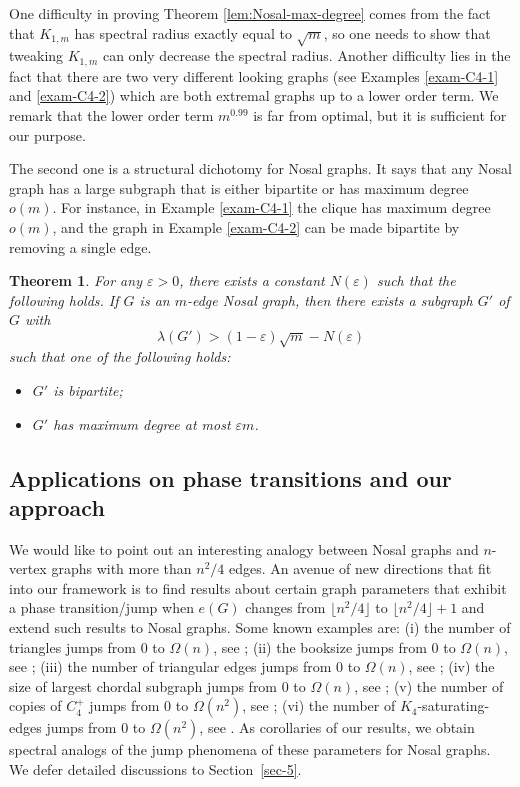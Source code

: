 \documentclass[11pt,a4paper]{article}
\newtheorem{theorem}{Theorem}[section]
\theoremstyle{definition}
\theoremstyle{remark}
\begin{document}
One difficulty in proving Theorem \ref{lem:Nosal-max-degree} comes from the fact that  $K_{1, m}$ has spectral radius exactly equal to $\sqrt{m}$, so one needs to show that tweaking $K_{1, m}$ can only decrease the spectral radius. Another difficulty lies in the fact that there are two very different looking graphs (see Examples \ref{exam-C4-1} and \ref{exam-C4-2}) which are both extremal graphs up to a lower order term. We remark that the lower order term $m^{0.99}$ is far from optimal, but it is sufficient for our purpose.

The second one is a structural dichotomy for Nosal graphs. It says that any Nosal graph has a large subgraph that is either bipartite or has maximum degree $o(m)$. For instance, in Example \ref{exam-C4-1} the clique has maximum degree $o(m)$, and the graph in Example \ref{exam-C4-2} can be made bipartite by removing a single edge. 

\begin{theorem}
    \label{lem:Nosal-structure}
    For any $\varepsilon > 0$, there exists a constant $N(\varepsilon)$ such that the following holds. If $G$ is an $m$-edge Nosal graph, then there exists a subgraph $G'$ of $G$ with 
    \[ \lambda(G') > (1 - \varepsilon) \sqrt{m} - N(\varepsilon) \]
    such that one of the following holds: 
    \begin{itemize}
        \item[\rm (a)] $G'$ is bipartite; 
        \item[\rm (b)] $G'$ has maximum degree at most $\varepsilon m$.
    \end{itemize}
\end{theorem}

\subsection{Applications on phase transitions and our approach}


We would like to point out an interesting analogy between Nosal graphs and $n$-vertex graphs with more than $ n^2/4$ edges. An avenue of new directions that fit into our framework is to find results about certain graph parameters that exhibit a phase transition/jump when $e(G)$ changes from $\lfloor n^2/4 \rfloor$ to 
$\lfloor n^2/4 \rfloor +1$ and extend such results to Nosal graphs. Some known examples are: (i) the number of triangles jumps from $0$ to 
$\Omega (n)$, see \cite{Erd1955,Erdos1964}; (ii) the booksize jumps from $0$ to $\Omega (n)$, see \cite{KN1979,BN2005,LFP2024-triangular}; (iii) the number of triangular edges jumps from 
 $0$ to $\Omega (n)$, see \cite{EFR1992};  (iv) the size of largest chordal subgraph 
 jumps from $0$ to $\Omega (n)$, see \cite{EGOZ1989}; (v) the number of copies of $C_4^+$ jumps from 
$0$ to $\Omega (n^2)$, see \cite{Mubayi2010}; (vi) the number of $K_4$-saturating-edges jumps from $0$ to $\Omega (n^2)$, see \cite{BL2014}. 
As corollaries of our results, we obtain spectral analogs of the jump phenomena of these parameters for Nosal graphs. We defer detailed discussions to Section~\ref{sec-5}.
\end{document}
